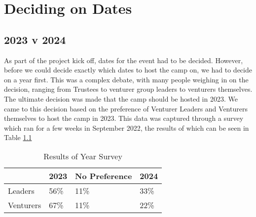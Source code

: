 \chapter{Deciding on Dates}
\section{2023 v 2024}
As part of the project kick off, dates for the event had to be decided. However, before we could decide exactly which dates to host the camp on, we had to decide on a year first. This was a complex debate, with many people weighing in on the decision, ranging from Trustees to venturer group leaders to venturers themselves.\\

The ultimate decision was made that the camp should be hosted in 2023. We came to this decision based on the preference of Venturer Leaders and Venturers themselves to host the camp in 2023. This data was captured through a survey which ran for a few weeks in September 2022, the results of which can be seen in Table \ref*{tab:year-survey-results}

\begin{table}[h]
    \centering
    {\RaggedRight
    \begin{tabular}{p{} p{} p{} p{}}
    \textbf{} & \textbf{2023} & \textbf{No Preference} & \textbf{2024}\\
    \hline
    \hline
    Leaders & 56\% & 11\% & 33\% \\
    \hline
    Venturers & 67\% & 11\% & 22\% \\
    \hline
    \end{tabular}
    } %
    \caption{Results of Year Survey}
    \label{tab:year-survey-results}
\end{table}

